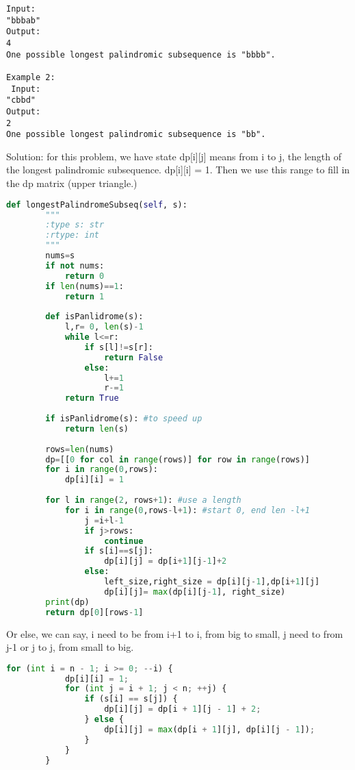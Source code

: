 \documentclass[../main.tex]{subfiles}
\begin{document}
\begin{examples}[resume]
\begin{lstlisting}[numbers=none]
 Input:
"bbbab"
Output:
4
One possible longest palindromic subsequence is "bbbb".

Example 2:
 Input:
"cbbd"
Output:
2
One possible longest palindromic subsequence is "bb".
\end{lstlisting}

Solution: for this problem, we have state dp[i][j] means from i to j, the length of the longest palindromic subsequence. dp[i][i] = 1. Then we use this range to fill in the dp matrix (upper triangle.)
\begin{lstlisting}[language = Python]
def longestPalindromeSubseq(self, s):
        """
        :type s: str
        :rtype: int
        """
        nums=s
        if not nums:
            return 0
        if len(nums)==1:
            return 1
        
        def isPanlidrome(s):
            l,r= 0, len(s)-1
            while l<=r:
                if s[l]!=s[r]:
                    return False
                else:
                    l+=1
                    r-=1
            return True
        
        if isPanlidrome(s): #to speed up
            return len(s)
        
        rows=len(nums)
        dp=[[0 for col in range(rows)] for row in range(rows)]
        for i in range(0,rows):
            dp[i][i] = 1
        
        for l in range(2, rows+1): #use a length
            for i in range(0,rows-l+1): #start 0, end len -l+1
                j =i+l-1
                if j>rows:
                    continue
                if s[i]==s[j]:
                    dp[i][j] = dp[i+1][j-1]+2
                else:
                    left_size,right_size = dp[i][j-1],dp[i+1][j]
                    dp[i][j]= max(dp[i][j-1], right_size)
        print(dp)
        return dp[0][rows-1]
\end{lstlisting}

Or else, we can say, i need to be from i+1 to i, from big to small, j need to from j-1 or j to j, from small to big.
\begin{lstlisting}[language = Python]
for (int i = n - 1; i >= 0; --i) {
            dp[i][i] = 1;
            for (int j = i + 1; j < n; ++j) {
                if (s[i] == s[j]) {
                    dp[i][j] = dp[i + 1][j - 1] + 2;
                } else {
                    dp[i][j] = max(dp[i + 1][j], dp[i][j - 1]);
                }
            }
        }
\end{lstlisting}


\end{examples}
\end{document}
